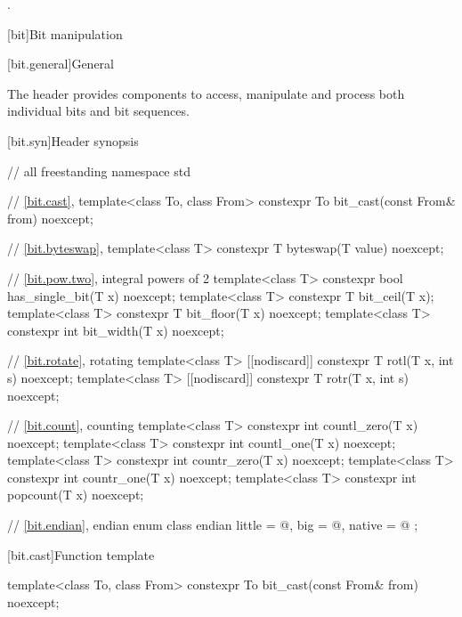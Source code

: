 \begin{itemdescr}
\pnum
\ensures
{}.
\end{itemdescr}

[bit]{Bit manipulation}

[bit.general]{General}

\pnum
The header  provides components to access,
manipulate and process both individual bits and bit sequences.

[bit.syn]{Header  synopsis}

\begin{codeblock}
// all freestanding
namespace std {
  // \ref{bit.cast}, 
  template<class To, class From>
    constexpr To bit_cast(const From& from) noexcept;

  // \ref{bit.byteswap}, 
  template<class T>
    constexpr T byteswap(T value) noexcept;

  // \ref{bit.pow.two}, integral powers of 2
  template<class T>
    constexpr bool has_single_bit(T x) noexcept;
  template<class T>
    constexpr T bit_ceil(T x);
  template<class T>
    constexpr T bit_floor(T x) noexcept;
  template<class T>
    constexpr int bit_width(T x) noexcept;

  // \ref{bit.rotate}, rotating
  template<class T>
    [[nodiscard]] constexpr T rotl(T x, int s) noexcept;
  template<class T>
    [[nodiscard]] constexpr T rotr(T x, int s) noexcept;

  // \ref{bit.count}, counting
  template<class T>
    constexpr int countl_zero(T x) noexcept;
  template<class T>
    constexpr int countl_one(T x) noexcept;
  template<class T>
    constexpr int countr_zero(T x) noexcept;
  template<class T>
    constexpr int countr_one(T x) noexcept;
  template<class T>
    constexpr int popcount(T x) noexcept;

  // \ref{bit.endian}, endian
  enum class endian {
    little = @\seebelow@,
    big    = @\seebelow@,
    native = @\seebelow@
  };
}
\end{codeblock}

[bit.cast]{Function template }

%
\begin{itemdecl}
template<class To, class From>
  constexpr To bit_cast(const From& from) noexcept;
\end{itemdecl}

